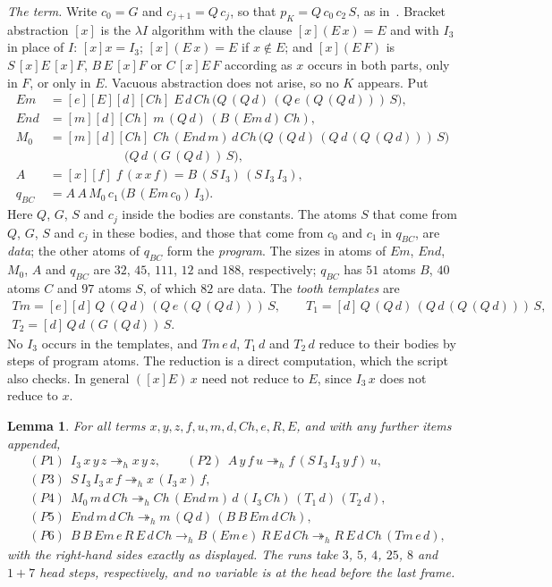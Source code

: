 \documentclass[11pt]{amsart}
\newtheorem{lemma}[theorem]{Lemma}
\theoremstyle{definition}
\newcommand{\hred}{\twoheadrightarrow_h}
\newcommand{\hstep}{\to_h}
\newcommand{\pK}{p_K}
\newcommand{\qBC}{q_{BC}}
\newcommand{\Ir}{I_3}
\newcommand{\Em}{\mathit{Em}}
\newcommand{\End}{\mathit{End}}
\newcommand{\Mz}{M_0}
\newcommand{\Tem}{\mathit{Tm}}
\newcommand{\Ch}{\mathit{Ch}}
\begin{document}
\emph{The term.} Write $c_0=G$ and $c_{j+1}=Q\,c_j$, so that $\pK=Q\,c_0\,c_2\,S$, as
in~\citep[\S3]{s11}. Bracket abstraction $[x]$ is the $\lambda I$ algorithm with the clause
$[x](E\,x)=E$ and with $\Ir$ in place of $I$: $[x]x=\Ir$; $[x](E\,x)=E$ if $x\notin E$; and $[x](E\,F)$
is $S\,[x]E\,[x]F$, $B\,E\,[x]F$ or $C\,[x]E\,F$ according as $x$ occurs in both parts, only in $F$, or
only in $E$. Vacuous abstraction does not arise, so no $K$ appears. Put
\begin{align*}
\Em&=[e][E][d][\Ch]\;E\,d\,\Ch\,\bigl(Q\,(Q\,d)\,(Q\,e\,(Q\,(Q\,d)))\,S\bigr),\\
\End&=[m][d][\Ch]\;m\,(Q\,d)\,(B\,(\Em\,d)\,\Ch),\\
\Mz&=[m][d][\Ch]\;\Ch\,(\End\,m)\,d\,\Ch\,\bigl(Q\,(Q\,d)\,(Q\,d\,(Q\,(Q\,d)))\,S\bigr)\\
&\qquad\qquad\qquad\bigl(Q\,d\,(G\,(Q\,d))\,S\bigr),\\
A&=[x][f]\;f\,(x\,x\,f)=B\,(S\,\Ir)\,(S\,\Ir\,\Ir),\\
\qBC&=A\,A\,\Mz\,c_1\,\bigl(B\,(\Em\,c_0)\,\Ir\bigr).
\end{align*}
Here $Q$, $G$, $S$ and $c_j$ inside the bodies are constants. The atoms $S$ that come from $Q$, $G$,
$S$ and $c_j$ in these bodies, and those that come from $c_0$ and $c_1$ in $\qBC$, are \emph{data}; the
other atoms of $\qBC$ form the \emph{program}. The sizes in atoms of $\Em$, $\End$, $\Mz$, $A$ and $\qBC$
are $32$, $45$, $111$, $12$ and $188$, respectively; $\qBC$ has $51$ atoms $B$, $40$ atoms $C$ and $97$
atoms $S$, of which $82$ are data. The \emph{tooth templates} are
\begin{gather*}
\Tem=[e][d]\,Q\,(Q\,d)\,(Q\,e\,(Q\,(Q\,d)))\,S,\qquad
T_1=[d]\,Q\,(Q\,d)\,(Q\,d\,(Q\,(Q\,d)))\,S,\\
T_2=[d]\,Q\,d\,(G\,(Q\,d))\,S.
\end{gather*}
No $\Ir$ occurs in the templates, and $\Tem\,e\,d$, $T_1\,d$ and $T_2\,d$ reduce to their bodies by
steps of program atoms. The reduction is a direct computation, which the script also checks. In
general $([x]E)\,x$ need not reduce to $E$, since $\Ir\,x$ does not reduce to $x$.

\begin{lemma}\label{lem:pass}
For all terms $x,y,z,f,u,m,d,\Ch,e,R,E$, and with any further items appended,
\begin{align*}
&(P1)\ \ \Ir\,x\,y\,z\hred x\,y\,z, \qquad (P2)\ \ A\,y\,f\,u\hred f\,(S\,\Ir\,\Ir\,y\,f)\,u,\\
&(P3)\ \ S\,\Ir\,\Ir\,x\,f\hred x\,(\Ir\,x)\,f,\\
&(P4)\ \ \Mz\,m\,d\,\Ch\hred\Ch\,(\End\,m)\,d\,(\Ir\,\Ch)\,(T_1\,d)\,(T_2\,d),\\
&(P5)\ \ \End\,m\,d\,\Ch\hred m\,(Q\,d)\,(B\,B\,\Em\,d\,\Ch),\\
&(P6)\ \ B\,B\,\Em\,e\,R\,E\,d\,\Ch\hstep B\,(\Em\,e)\,R\,E\,d\,\Ch\hred R\,E\,d\,\Ch\,(\Tem\,e\,d),
\end{align*}
with the right-hand sides exactly as displayed. The runs take $3$, $5$, $4$, $25$, $8$ and $1+7$ head
steps, respectively, and no variable is at the head before the last frame.
\end{lemma}
\end{document}
